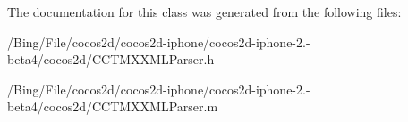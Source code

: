 The documentation for this class was generated from the following files\-:\begin{DoxyCompactItemize}
\item 
/\-Bing/\-File/cocos2d/cocos2d-\/iphone/cocos2d-\/iphone-\/2.-\/beta4/cocos2d/C\-C\-T\-M\-X\-X\-M\-L\-Parser.\-h\item 
/\-Bing/\-File/cocos2d/cocos2d-\/iphone/cocos2d-\/iphone-\/2.-\/beta4/cocos2d/C\-C\-T\-M\-X\-X\-M\-L\-Parser.\-m\end{DoxyCompactItemize}
